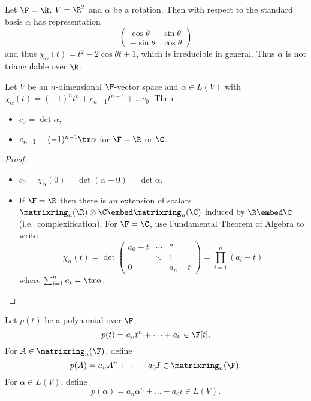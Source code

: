 \documentclass[a4paper]{article}
\newcommand*{\M}{\matrixring}
\theoremstyle{definition}
\begin{document}
\begin{eg}
  \label{eg:rotation}
  Let \(\F = \R\), \(V = \R^2\) and \(\alpha\) be a rotation. Then with respect to the standard basis \(\alpha\) has representation
  \[
    \begin{pmatrix}
      \cos \theta & \sin \theta \\
      -\sin \theta & \cos \theta
    \end{pmatrix}
  \]
  and thus \(\chi_\alpha(t) = t^2 - 2 \cos \theta t + 1\), which is irreducible in general. Thus \(\alpha\) is not triangulable over \(\R\).
\end{eg}

\begin{lemma}
  \label{lem:determinant from characteristic}
  Let \(V\) be an \(n\)-dimensional \(\F\)-vector space and \(\alpha \in L(V)\) with \(\chi_\alpha(t) = (-1)^n t^n + c_{n - 1} t^{n - 1} + \dots c_0\). Then
  \begin{itemize}
  \item \(c_0 = \det \alpha\),
  \item \(c_{n - 1} = (-1)^{n - 1} \tr \alpha\) for \(\F = \R\) or \(\C\).
  \end{itemize}
\end{lemma}

\begin{proof}\leavevmode
  \label{proof:determinant from characteristic}
  \begin{itemize}
  \item \(c_0 = \chi_\alpha(0) = \det (\alpha - 0) = \det \alpha\).
  \item If \(\F = \R\) then there is an extension of scalars \(\M_n(\R) \otimes \C \embed \M_n(\C)\) induced by \(\R \embed \C\) (i.e.\ complexification). For \(\F = \C\), use Fundamental Theorem of Algebra to write
    \[
      \chi_\alpha(t) = \det
      \begin{pmatrix}
        a_0 - t & \cdots & * \\
        & \ddots & \vdots \\
        0 & & a_n - t
      \end{pmatrix}
      = \prod_{i = 1}^{n} (a_i - t)
    \]
    where \(\sum_{i = 1}^n a_i = \tr \alpha\).
  \end{itemize}
\end{proof}

\begin{notation}
  Let \(p(t)\) be a polynomial over \(\F\),
  \[
    p(t) = a_nt^n + \dots + a_0 \in \F[t].
  \]
  For \(A \in \M_n(\F)\), define
  \[
    p(A) = a_nA^n + \dots + a_0I \in \M_n(\F).
  \]
  For \(\alpha \in L(V)\), define
  \[
    p(\alpha) = a_n\alpha^n + \dots + a_0\iota \in L(V).
  \]
\end{notation}
\end{document}
